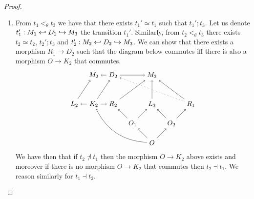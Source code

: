 \begin{proof}
  \begin{enumerate}
  \item

    From $t_1<_{\theta} t_3$ we have that there exists $t_1'\simeq t_1$ such that $t_1';t_3$. Let us denote
$t_1':M_1\hookleftarrow D_1 \hookrightarrow M_3$ the transition $t_1'$. Similarly, from $t_2<_{\theta} t_3$ there exists $t_2\simeq t_2$, $t_2';t_3$ and $t_2':M_2\hookleftarrow D_2 \hookrightarrow M_3$.
    We can show that there exists a morphism $R_1\to D_2$ such that the diagram below commutes iff there is also a morphism $O\to K_2$ that commutes.
    \[
    \begin{tikzpicture} %
      \node (o) at (0,-1) {\(O\)};
      \node (r3) at (0,1) {\(L_3\)};
      \node (o1) at (-1,0) {\(O_1\)};
      \node (o2) at (1,0) {\(O_2\)};
      \node (r1) at (-2,1) {\(R_2\)};
      \node (r2) at (2,1) {\(R_1\)};
      \node (k1) at (-3,1) {\(K_2\)};
      \node (l1) at (-4,1) {\(L_2\)};
      \node (m3) at (0,2.5) {\(M_3\)};
      \node (d2) at (-2,2.5) {\(D_2\)};
      \node (m2) at (-3,2.5) {\(M_2\)};
      \draw [->] (o) -- (o1);
      \draw [->] (o) -- (o2);
      \draw [->] (o1) -- (r3);
      \draw [->] (o2) -- (r3);
      \draw [->] (o1) -- (r1);
      \draw [->] (o2) -- (r2);
      \draw [->] (k1) -- (r1);
      \draw [->] (o) to [bend left] (k1);
      \draw [->] (k1) -- (l1);
      \draw [->] (d2) -- (m2);
      \draw [->] (d2) -- (m3);
      \draw [->] (k1) -- (d2);
      \draw [->] (l1) -- (m2);
      \draw [->] (r1) -- (m3);
      \draw [->] (r3) -- (m3);
      \draw [->] (r2) -- (m3);
      \draw [dotted,->] (r2) -- (d2);
    \end{tikzpicture}
    \]
    We have then that if $t_2\not\dashv t_1$ then the morphism $O\to K_2$ above exists and moreover if there is no morphism $O\to K_2$ that commutes then $t_2\dashv t_1$. We reason similarly for $t_1\dashv t_2$.


\end{enumerate}
\end{proof}
